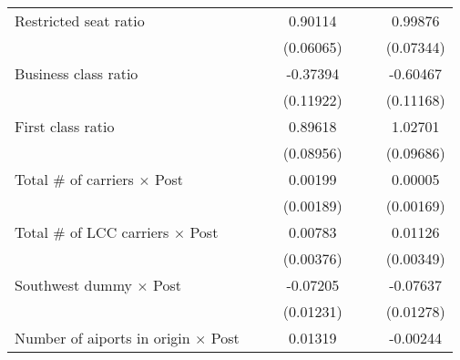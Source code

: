 \begin{table}[htbp]
\begin{tabular}{l*{6}{c}}
\addlinespace
Restricted seat ratio&                     &                     &     0.90114\sym{***}&                     &                     &     0.99876\sym{***}\\
                    &                     &                     &   (0.06065)         &                     &                     &   (0.07344)         \\
\addlinespace
Business class ratio&                     &                     &    -0.37394\sym{***}&                     &                     &    -0.60467\sym{***}\\
                    &                     &                     &   (0.11922)         &                     &                     &   (0.11168)         \\
\addlinespace
First class ratio   &                     &                     &     0.89618\sym{***}&                     &                     &     1.02701\sym{***}\\
                    &                     &                     &   (0.08956)         &                     &                     &   (0.09686)         \\
\addlinespace
Total # of carriers $\times$ Post&                     &                     &     0.00199         &                     &                     &     0.00005         \\
                    &                     &                     &   (0.00189)         &                     &                     &   (0.00169)         \\
\addlinespace
Total # of LCC carriers $\times$ Post&                     &                     &     0.00783\sym{**} &                     &                     &     0.01126\sym{***}\\
                    &                     &                     &   (0.00376)         &                     &                     &   (0.00349)         \\
\addlinespace
Southwest dummy $\times$ Post&                     &                     &    -0.07205\sym{***}&                     &                     &    -0.07637\sym{***}\\
                    &                     &                     &   (0.01231)         &                     &                     &   (0.01278)         \\
\addlinespace
Number of aiports in origin $\times$ Post&                     &                     &     0.01319         &                     &                     &    -0.00244         \\

\end{tabular}
\end{table}
